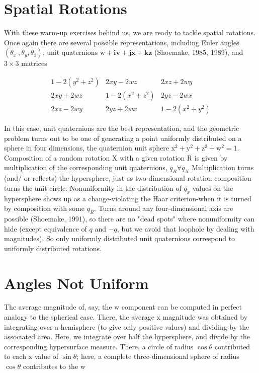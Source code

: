 \section{Spatial Rotations}
With these warm-up exercises behind us, we are ready to tackle spatial rotations. Once again there are several possible representations, including Euler angles $\left(\theta_{x^{\prime}}, \theta_{y}, \theta_{z}\right)$, unit quaternions $\mathrm{w}+\mathbf{i v}+\mathbf{j x}+\mathbf{k z}$ (Shoemake, 1985, 1989), and $3 \times 3$ matrices

$$
\begin{array}{ccc}
1-2\left(y^{2}+z^{2}\right) & 2 x y-2 w z & 2 x z+2 w y \\
2 x y+2 w z & 1-2\left(x^{2}+z^{2}\right) & 2 y z-2 w x \\
2 x z-2 w y & 2 y z+2 w x & 1-2\left(x^{2}+y^{2}\right)
\end{array}
$$

In this case, unit quaternions are the best representation, and the geometric problem turns out to be one of generating a point uniformly distributed on a sphere in four dimensions, the quaternion unit sphere $\mathrm{x}^{2}+\mathrm{y}^{2}+\mathrm{z}^{2}+\mathrm{w}^{2}=1$. Composition of a random rotation $\mathrm{X}$ with a given rotation $\mathrm{R}$ is given by multiplication of the corresponding unit quaternions, $q_{R} \forall q_{X}$ Multiplication turns (and/ or reflects) the hypersphere, just as two-dimensional rotation composition turns the unit circle. Nonuniformity in the distribution of $q_{x}$ values on the hypersphere shows up as a change-violating the Haar criterion-when it is turned by composition with some $q_{R}$. Turns around any four-dimensional axis are possible (Shoemake, 1991), so there are no "dead spots" where nonuniformity can hide (except equivalence of $q$ and $-q$, but we avoid that loophole by dealing with magnitudes). So only uniformly distributed unit quaternions correspond to uniformly distributed rotations.

\section{Angles Not Uniform}
The average magnitude of, say, the $\mathrm{w}$ component can be computed in perfect analogy to the spherical case. There, the average $\mathrm{x}$ magnitude was obtained by integrating over a hemisphere (to give only positive values) and dividing by the associated area. Here, we integrate over half the hypersphere, and divide by the corresponding hypersurface measure. There, a circle of radius $\cos \theta$ contributed to each $\mathrm{x}$ value of $\sin \theta$; here, a complete three-dimensional sphere of radius $\cos \theta$ contributes to the $\mathrm{w}$

